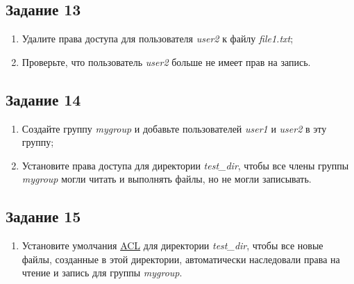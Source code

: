 \documentclass[12pt, a4paper]{report}
\begin{document}
	\subsection*{Задание 13}
	\begin{enumerate}
		\item Удалите права доступа для пользователя \textit{user2} к файлу \textit{file1.txt};
		\item Проверьте, что пользователь \textit{user2} больше не имеет прав на запись.
	\end{enumerate}
	\lstset{style=mystyle}
	

	\subsection*{Задание 14}
	\begin{enumerate}
		\item Создайте группу \textit{mygroup} и добавьте пользователей \textit{user1} и \textit{user2} в эту группу;
		\item Установите права доступа для директории \textit{test\_dir}, чтобы все члены группы \textit{mygroup} могли читать и выполнять файлы, но не могли записывать.
	\end{enumerate}
	\lstset{style=mystyle}
	

	\subsection*{Задание 15}
	\begin{enumerate}
		\item Установите умолчания \underline{ACL} для директории \textit{test\_dir}, чтобы все новые файлы, созданные в этой директории, автоматически наследовали права на чтение и запись для группы \textit{mygroup}.
	\end{enumerate}
	\lstset{style=mystyle}
	
\end{document}
